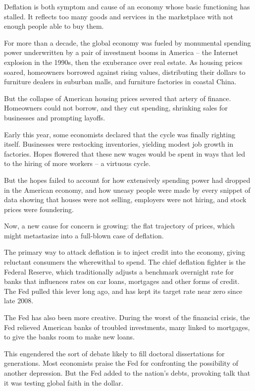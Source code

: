 ﻿\documentclass[12pt]{article}
\begin{document}
Deflation is both symptom and cause of an economy whose basic functioning has stalled. It reflects
too many goods and services in the marketplace with not enough people able to buy them.

For more than a decade, the global economy was fueled by monumental spending power underwritten by a
pair of investment booms in America -- the Internet explosion in the 1990s, then the exuberance over
real estate. As housing prices soared, homeowners borrowed against rising values, distributing their
dollars to furniture dealers in suburban malls, and furniture factories in coastal China.

But the collapse of American housing prices severed that artery of finance. Homeowners could not
borrow, and they cut spending, shrinking sales for businesses and prompting layoffs.

Early this year, some economists declared that the cycle was finally righting itself. Businesses
were restocking inventories, yielding modest job growth in factories. Hopes flowered that these new
wages would be spent in ways that led to the hiring of more workers -- a virtuous cycle.

But the hopes failed to account for how extensively spending power had dropped in the American
economy, and how uneasy people were made by every snippet of data showing that houses were not
selling, employers were not hiring, and stock prices were foundering.

Now, a new cause for concern is growing: the flat trajectory of prices, which might metastasize into
a full-blown case of deflation.

The primary way to attack deflation is to inject credit into the economy, giving reluctant consumers
the wherewithal to spend. The chief deflation fighter is the Federal Reserve, which traditionally
adjusts a benchmark overnight rate for banks that influences rates on car loans, mortgages and other
forms of credit. The Fed pulled this lever long ago, and has kept its target rate near zero since
late 2008.

The Fed has also been more creative. During the worst of the financial crisis, the Fed relieved
American banks of troubled investments, many linked to mortgages, to give the banks room to make new
loans.

This engendered the sort of debate likely to fill doctoral dissertations for generations. Most
economists praise the Fed for confronting the possibility of another depression. But the Fed added
to the nation's debts, provoking talk that it was testing global faith in the dollar.
\end{document}
